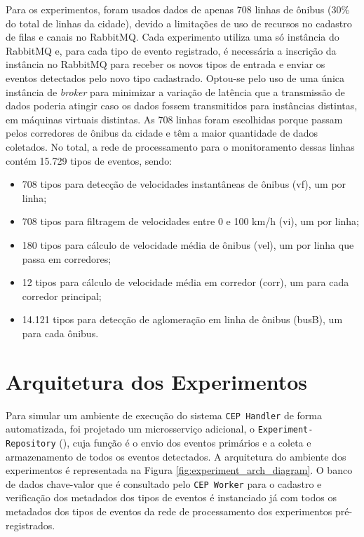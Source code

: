 Para os experimentos, foram usados dados de apenas 708 linhas de ônibus (30\% do total de linhas da cidade), devido a limitações de uso de recursos no cadastro de filas e canais no RabbitMQ. Cada experimento utiliza uma só instância do RabbitMQ e, para cada tipo de evento registrado, é necessária a inscrição da instância no RabbitMQ para receber os novos tipos de entrada e enviar os eventos detectados pelo novo tipo cadastrado. Optou-se pelo uso de uma única instância de \textit{broker} para minimizar a variação de latência que a transmissão de dados poderia atingir caso os dados fossem transmitidos para instâncias distintas, em máquinas virtuais distintas. As 708 linhas foram escolhidas porque passam pelos corredores de ônibus da cidade e têm a maior quantidade de dados coletados. No total, a rede de processamento para o monitoramento dessas linhas contém 15.729 tipos de eventos, sendo:
\begin{itemize}
    \item 708 tipos para detecção de velocidades instantâneas de ônibus (vf), um por linha;
    \item 708 tipos para filtragem de velocidades entre 0 e 100 km/h (vi), um por linha;
    \item 180 tipos para cálculo de velocidade média de ônibus (vel), um por linha que passa em corredores;
    \item 12 tipos para cálculo de velocidade média em corredor (corr), um para cada corredor principal;
    \item 14.121 tipos para detecção de aglomeração em linha de ônibus (busB), um para cada ônibus.
\end{itemize}


\section{Arquitetura dos Experimentos}
\label{sec:experiment_architecture}
Para simular um ambiente de execução do sistema \texttt{CEP Handler} de forma automatizada, foi projetado um microsserviço adicional, o \texttt{Experiment-Repository} (\cite{Experiment-Repository}), cuja função é o envio dos eventos primários e a coleta e armazenamento de todos os eventos detectados. A arquitetura do ambiente dos experimentos é representada na Figura \ref{fig:experiment_arch_diagram}.
O banco de dados chave-valor que é consultado pelo \texttt{CEP Worker} para o cadastro e verificação dos metadados dos tipos de eventos é instanciado já com todos os metadados dos tipos de eventos da rede de processamento dos experimentos pré-registrados.

